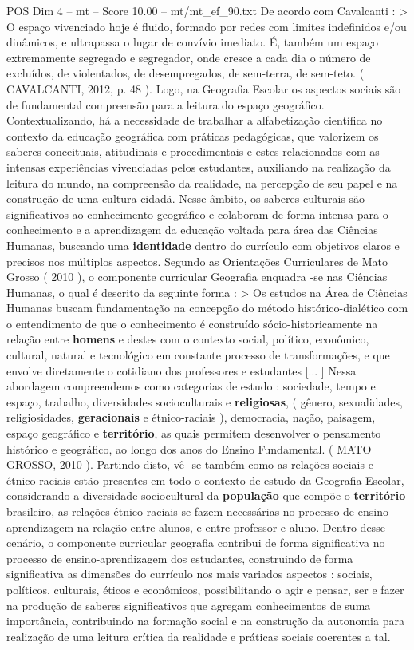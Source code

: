 \begin{textsample}{POS Dim 4 – mt – Score 10.00 – mt/mt\_ef\_90.txt}
De acordo com Cavalcanti : > O espaço vivenciado hoje é fluido, formado por redes com limites indefinidos e/ou dinâmicos, e ultrapassa o lugar de convívio imediato.
É, também um espaço extremamente segregado e segregador, onde cresce a cada dia o número de excluídos, de violentados, de desempregados, de sem-terra, de sem-teto. ( CAVALCANTI, 2012, p. 48 ).
Logo, na Geografia Escolar os aspectos sociais são de fundamental compreensão para a leitura do espaço geográfico.
Contextualizando, há a necessidade de trabalhar a alfabetização científica no contexto da educação geográfica com práticas pedagógicas, que valorizem os saberes conceituais, atitudinais e procedimentais e estes relacionados com as intensas experiências vivenciadas pelos estudantes, auxiliando na realização da leitura do mundo, na compreensão da realidade, na percepção de seu papel e na construção de uma cultura cidadã.
Nesse âmbito, os saberes culturais são significativos ao conhecimento geográfico e colaboram de forma intensa para o conhecimento e a aprendizagem da educação voltada para área das Ciências Humanas, buscando uma \textbf{identidade} dentro do currículo com objetivos claros e precisos nos múltiplos aspectos.
Segundo as Orientações Curriculares de Mato Grosso ( 2010 ), o componente curricular Geografia enquadra -se nas Ciências Humanas, o qual é descrito da seguinte forma : > Os estudos na Área de Ciências Humanas buscam fundamentação na concepção do método histórico-dialético com o entendimento de que o conhecimento é construído sócio-historicamente na relação entre \textbf{homens} e destes com o contexto social, político, econômico, cultural, natural e tecnológico em constante processo de transformações, e que envolve diretamente o cotidiano dos professores e estudantes [... ] Nessa abordagem compreendemos como categorias de estudo : sociedade, tempo e espaço, trabalho, diversidades socioculturais e \textbf{religiosas}, ( gênero, sexualidades, religiosidades, \textbf{geracionais} e étnico-raciais ), democracia, nação, paisagem, espaço geográfico e \textbf{território}, as quais permitem desenvolver o pensamento histórico e geográfico, ao longo dos anos do Ensino Fundamental. ( MATO GROSSO, 2010 ).
Partindo disto, vê -se também como as relações sociais e étnico-raciais estão presentes em todo o contexto de estudo da Geografia Escolar, considerando a diversidade sociocultural da \textbf{população} que compõe o \textbf{território} brasileiro, as relações étnico-raciais se fazem necessárias no processo de ensino-aprendizagem na relação entre alunos, e entre professor e aluno.
Dentro desse cenário, o componente curricular geografia contribui de forma significativa no processo de ensino-aprendizagem dos estudantes, construindo de forma significativa as dimensões do currículo nos mais variados aspectos : sociais, políticos, culturais, éticos e econômicos, possibilitando o agir e pensar, ser e fazer na produção de saberes significativos que agregam conhecimentos de suma importância, contribuindo na formação social e na construção da autonomia para realização de uma leitura crítica da realidade e práticas sociais coerentes a tal.

\end{textsample}
